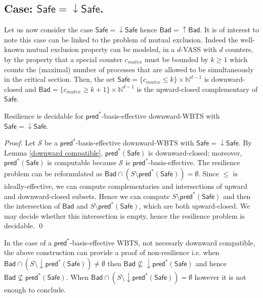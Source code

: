 \documentclass[runningheads]{llncs}
\newcommand{\alain}[1]{\todo[inline,color=red!20]{{\bf AF:} #1}}
\newcommand{\pred}{\textsf{pred}}
\newcommand{\Bad}{\textsf{Bad}}
\newcommand{\Safe}{\textsf{Safe}}
\begin{document}
\subsection{Case: $\Safe=\mathop{\downarrow} \Safe$.}\label{safe-down}


Let us now consider the case $\Safe=\mathop{\downarrow} \Safe$ hence $\Bad=\mathop{\uparrow} \Bad$.
It is of interest to note this case can be linked to the problem of mutual exclusion.
Indeed the well-known mutual exclusion property can be modeled, in a $d$-VASS with $d$ counters, by the property that a special counter $c_{mutex}$ must be bounded by $k \geq 1$ which counts the (maximal) number of processes that are allowed to be simultaneously in the critical section. Then, the set $\Safe =  \{c_{mutex} \leq k\} \times \mathbb{N}^{d-1}$ is downward-closed		and $\Bad =\{c_{mutex} \geq k+1\} \times  \mathbb{N}^{d-1} $ is the upward-closed complementary of $\Safe$. 


%
\begin{theorem}\label{up-down}
{\sc Resilience}  is decidable for $\pred^*$-basis-effective downward-WBTS with 
$\Safe=\mathop{\downarrow} \Safe$.
\end{theorem}

\begin{proof}
Let $\mathscr{S}$ be a $\pred^*$-basis-effective downward-WBTS with 
$\Safe=\mathop{\downarrow} \Safe$.
By Lemma \ref{downward compatible}, $\pred^*(\Safe)$ is downward-closed; moreover, $\pred^*(\Safe)$ is computable because $\mathscr{S}$ is $\pred^*$-basis-effective.
The resilience problem can be reformulated as $\Bad \cap (S \setminus \pred^*(\Safe)) = \emptyset$.
Since $\leq$ is ideally-effective, we can compute complementaries and intersections of upward and downward-closed
 subsets.
Hence we can compute $S \setminus \pred^*(\Safe)$ and then the intersection of
$\Bad$
and
$S \setminus \pred^*(\Safe)$,
which are both upward-closed. We may decide whether this intersection is empty, hence
the resilience problem is decidable. \qed
\end{proof}


In the case
of a $\pred^*$-basis-effective WBTS, not necesarly downward compatible,
the above construction
can provide a proof
of non-resilience
i.e. when
$\Bad \cap (S \setminus \mathop{\downarrow}\pred^*(\Safe)) \neq \emptyset$
then
$\Bad \not\subseteq \mathop{\downarrow}\pred^*(\Safe)$
and hence
$\Bad \not\subseteq \pred^*(\Safe)$.
When $\Bad \cap (S \setminus \mathop{\downarrow}\pred^*(\Safe)) = \emptyset$
however
it is not enough to conclude.\\
\end{document}
